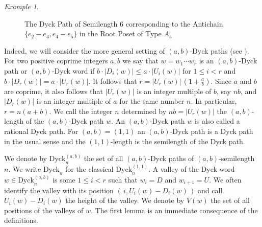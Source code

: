 \documentclass[11pt]{amsart}
\def\Dyck{\mathrm{Dyck}}
\theoremstyle{plain}
\numberwithin{lemma}{\DefaultNumberTheoremWithin}
\numberwithin{theorem}{\DefaultNumberTheoremWithin}
\numberwithin{corollary}{\DefaultNumberTheoremWithin}
\numberwithin{proposition}{\DefaultNumberTheoremWithin}
\numberwithin{conjecture}{\DefaultNumberTheoremWithin}
\theoremstyle{definition}
\numberwithin{definition}{\DefaultNumberTheoremWithin}
\numberwithin{question}{\DefaultNumberTheoremWithin}
\numberwithin{problem}{\DefaultNumberTheoremWithin}
\theoremstyle{remark}
\numberwithin{remark}{\DefaultNumberTheoremWithin}
\newtheorem{example}{Example}
\numberwithin{example}{\DefaultNumberTheoremWithin}
\numberwithin{claim}{\DefaultNumberTheoremWithin}
\begin{document}
\begin{example}
\begin{figure}[ht!]
\caption{The Dyck Path of Semilength $6$ corresponding to the Antichain 
$\{e_2-e_4,e_4-e_5\}$ in the Root Poset of Type $A_5$} \label{fig:dyck}
\end{figure}
\end{example}


Indeed, we will consider the more general setting of $(a,b)$-Dyck paths (see \cite{ARW13}).
For two positive coprime integers $a,b$
we say that $w = w_1\cdots w_r$ is an $(a,b)$-Dyck path or $(a,b)$-Dyck word if
$b\cdot |D_i(w)| \leq a \cdot |U_i(w)|$ for $1 \leq i < r$ and
$b \cdot |D_{r}(w)| = a \cdot |U_{r}(w)|$.
It follows that $r = |U_r(w)|\,(1+\frac{a}{b})$.
Since $a$ and $b$ are coprime, it also follows that $|U_r(w)|$ is an integer multiple of $b$, say $nb$, and $|D_r(w)|$ is an integer multiple of $a$ for the same
number $n$. In particular, $r = n(a+b)$.
We call the integer $n$ determined by $nb= |U_r(w)|$ the $(a,b)$-length of the $(a,b)$-Dyck path $w$.
An $(a,b)$-Dyck path $w$ is also called a rational Dyck path.
For $(a,b) = (1,1)$ an $(a,b)$-Dyck path is a Dyck path in the
usual sense and the $(1,1)$-length is the semilength of the Dyck path. 

We denote by $\Dyck_n^ {(a,b)}$ the set of all
$(a,b)$-Dyck paths of $(a,b)$-semilength $n$. We write $\Dyck_n$ for the classical $\Dyck_n^{(1,1)}$.
A valley of the Dyck word $w \in \Dyck_n^{(a,b)}$ is some $1 \leq i < r$ such that
$w_i = D$ and $w_{i+1} = U$.
We often identify the valley with its position $(\,i,U_i(w) - D_i(w)\,)$ 
and call $U_i(w)-D_i(w)$
the height of the valley. We denote by
$V(w)$ the set of all positions of the valleys of $w$. The first lemma is an immediate consequence of
the definitions.
\end{document}
